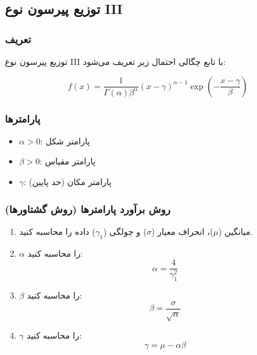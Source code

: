\documentclass[a4paper,12pt]{article}
\begin{document}
\subsection{توزیع پیرسون نوع III}

\subsubsection{تعریف}

توزیع پیرسون نوع III با تابع چگالی احتمال زیر تعریف می‌شود:

\begin{equation}
f(x) = \frac{1}{\Gamma(\alpha)\beta^\alpha} (x-\gamma)^{\alpha-1} \exp\left(-\frac{x-\gamma}{\beta}\right)
\end{equation}

\subsubsection{پارامترها}

\begin{itemize}
\item $\alpha > 0$: پارامتر شکل
\item $\beta > 0$: پارامتر مقیاس
\item $\gamma$: پارامتر مکان (حد پایین)
\end{itemize}

\subsubsection{روش برآورد پارامترها (روش گشتاورها)}

\begin{enumerate}
\item میانگین ($\mu$)، انحراف معیار ($\sigma$) و چولگی ($\gamma_1$) داده را محاسبه کنید.
\item $\alpha$ را محاسبه کنید:
\begin{equation}
\alpha = \frac{4}{\gamma_1^2}
\end{equation}
\item $\beta$ را محاسبه کنید:
\begin{equation}
\beta = \frac{\sigma}{\sqrt{\alpha}}
\end{equation}
\item $\gamma$ را محاسبه کنید:
\begin{equation}
\gamma = \mu - \alpha\beta
\end{equation}
\end{enumerate}
\end{document}
